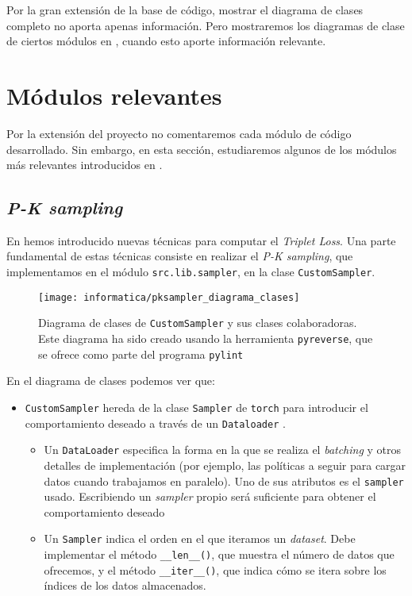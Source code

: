 Por la gran extensión de la base de código, mostrar el diagrama de clases completo no aporta apenas información. Pero mostraremos los diagramas de clase de ciertos módulos en , cuando esto aporte información relevante.

\section{Módulos relevantes} \label{isec:modulos_relevantes}

Por la extensión del proyecto no comentaremos cada módulo de código desarrollado. Sin embargo, en esta sección, estudiaremos algunos de los módulos más relevantes introducidos en .

\subsection{\textit{P-K sampling}}

En  hemos introducido nuevas técnicas para computar el \textit{Triplet Loss}. Una parte fundamental de estas técnicas consiste en realizar el \textit{P-K sampling}, que implementamos en el módulo \lstinline{src.lib.sampler}, en la clase \lstinline{CustomSampler}.

\begin{figure}[H]
    \centering
    \texttt{[image: informatica/pksampler\_diagrama\_clases]}
    \caption{Diagrama de clases de \lstinline{CustomSampler} y sus clases colaboradoras. Este diagrama ha sido creado usando la herramienta \lstinline{pyreverse}, que se ofrece como parte del programa \lstinline{pylint}}
    \label{img:diagrama_clases_CustomSampler}
\end{figure}

En el diagrama de clases  podemos ver que:

\begin{itemize}
    \item \lstinline{CustomSampler} hereda de la clase \lstinline{Sampler} de \lstinline{torch} para introducir el comportamiento deseado a través de un \lstinline{Dataloader} \cite{informatica:pytorch_sampler}.
        \begin{itemize}
            \item Un \lstinline{DataLoader} especifica la forma en la que se realiza el \textit{batching} y otros detalles de implementación (por ejemplo, las políticas a seguir para cargar datos cuando trabajamos en paralelo). Uno de sus atributos es el \lstinline{sampler} usado. Escribiendo un \textit{sampler} propio será suficiente para obtener el comportamiento deseado
            \item Un \lstinline{Sampler} indica el orden en el que iteramos un \textit{dataset}. Debe implementar el método \lstinline{__len__()}, que muestra el número de datos que ofrecemos, y el método \lstinline{__iter__()}, que indica cómo se itera sobre los índices de los datos almacenados.
        \end{itemize}
\end{itemize}

